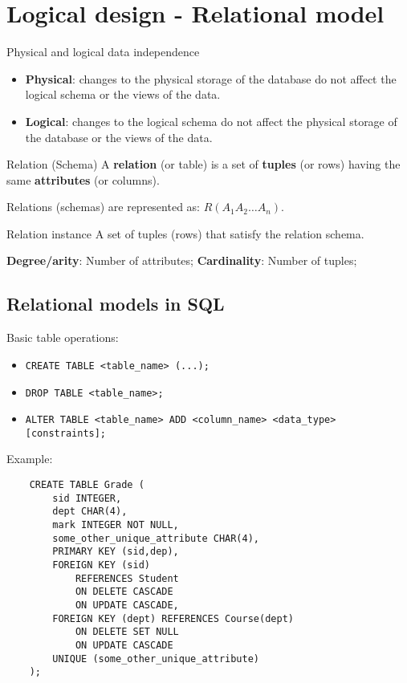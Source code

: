\section{Logical design - Relational model}

\begin{theorem}
    {Physical and logical data independence}
    \begin{itemize}
        \item \textbf{Physical}: changes to the physical storage of the database do not affect the logical schema or the views of the data.
        \item \textbf{Logical}: changes to the logical schema do not affect the physical storage of the database or the views of the data.
    \end{itemize}
\end{theorem}

\begin{definition}
    {Relation (Schema)}
    A \textbf{relation} (or table) is a set of \textbf{tuples} (or rows) having the same \textbf{attributes} (or columns).

    Relations (schemas) are represented as: $R(A_1A_2 \ldots A_n)$.
\end{definition}

\begin{knBox}
    {Relation instance}
    A set of tuples (rows) that satisfy the relation schema.

    \textbf{Degree/arity}: Number of attributes;
    \textbf{Cardinality}: Number of tuples;
\end{knBox}

\subsection{Relational models in SQL}

Basic table operations:

\begin{itemize}
    \item \verb|CREATE TABLE <table_name> (...);|
    \item \verb|DROP TABLE <table_name>;|
    \item \verb|ALTER TABLE <table_name> ADD <column_name> <data_type> [constraints];|
\end{itemize}

Example:

\begin{verbatim}
    CREATE TABLE Grade (
        sid INTEGER,
        dept CHAR(4), 
        mark INTEGER NOT NULL,
        some_other_unique_attribute CHAR(4),   
        PRIMARY KEY (sid,dep),
        FOREIGN KEY (sid) 
            REFERENCES Student
            ON DELETE CASCADE
            ON UPDATE CASCADE,
        FOREIGN KEY (dept) REFERENCES Course(dept)
            ON DELETE SET NULL
            ON UPDATE CASCADE
        UNIQUE (some_other_unique_attribute)
    );
\end{verbatim}

